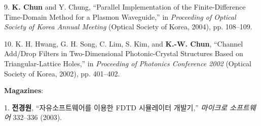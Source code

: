 \documentclass{gist}
\begin{document}
\begin{publication}{2cm}
\item[9.] \textbf{K. Chun} and Y. Chung, ``Parallel Implementation of the Finite-Difference Time-Domain Method for a Plasmon Waveguide,'' in \textit{Proceeding of Optical Society of Korea Annual Meeting} (Optical Society of Korea, 2004), pp. 108–109.
\item[10.] K. H. Hwang, G. H. Song, C. Lim, S. Kim, and \textbf{K.-W. Chun}, ``Channel Add/Drop Filters in Two-Dimensional Photonic-Crystal Structures Based on Triangular-Lattice Holes,'' in \textit{Proceeding of Photonics Conference 2002} (Optical Society of Korea, 2002), pp. 401–402.

\item[]\hspace{-\labelwidth}\hspace{-\labelsep}\textbf{Magazines}:
\item[1.] \textbf{전경원}, ``자유소프트웨어를 이용한 FDTD 시뮬레이터 개발기,'' \textit{마이크로 소프트웨어} 332–336 (2003).

\end{publication}

%
\end{document}
